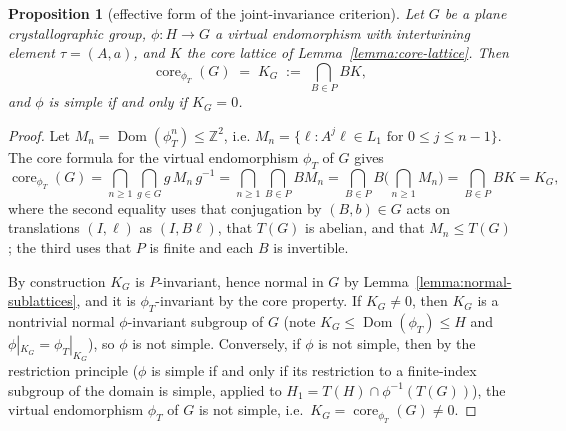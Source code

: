 \documentclass[12pt]{article}
\newtheorem{proposition}[theorem]{Proposition}
\theoremstyle{definition}
\begin{document}
\begin{proposition}[effective form of the joint-invariance
criterion]\label{prop:effective-core}
Let $G$ be a plane crystallographic group, $\phi:H\rightarrow G$ a
virtual endomorphism with intertwining element $\tau=(A,a)$, and $K$ the
core lattice of Lemma~\ref{lemma:core-lattice}. Then
\[
\operatorname{core}_{\phi_T}(G)
\;=\;
K_G \;:=\; \bigcap_{B\in P} BK,
\]
and $\phi$ is simple if and only if $K_G=0$.
\end{proposition}
\begin{proof}
Let $M_n=\operatorname{Dom}(\phi_T^n)\le\mathbb{Z}^2$, i.e.
$M_n=\{\ell : A^j\ell\in L_1 \text{ for } 0\le j\le n-1\}$. The core
formula for the virtual endomorphism $\phi_T$ of $G$ gives
\[
\operatorname{core}_{\phi_T}(G)
=\bigcap_{n\ge1}\bigcap_{g\in G} g\,M_n\,g^{-1}
=\bigcap_{n\ge1}\bigcap_{B\in P} B M_n
=\bigcap_{B\in P} B\Big(\bigcap_{n\ge1}M_n\Big)
=\bigcap_{B\in P} BK = K_G,
\]
where the second equality uses that conjugation by $(B,b)\in G$ acts on
translations $(I,\ell)$ as $(I,B\ell)$, that $T(G)$ is abelian, and that
$M_n\le T(G)$; the third uses that $P$ is finite and each $B$ is
invertible.

By construction $K_G$ is $P$-invariant, hence normal in $G$ by
Lemma~\ref{lemma:normal-sublattices}, and it is $\phi_T$-invariant by
the core property. If $K_G\ne0$, then $K_G$ is a nontrivial normal
$\phi$-invariant subgroup of $G$ (note $K_G\le
\operatorname{Dom}(\phi_T)\le H$ and $\phi|_{K_G}=\phi_T|_{K_G}$), so
$\phi$ is not simple. Conversely, if $\phi$ is not simple, then by the
restriction principle ($\phi$ is simple if and only if its restriction
to a finite-index subgroup of the domain is simple, applied to
$H_1=T(H)\cap\phi^{-1}(T(G))$), the virtual endomorphism $\phi_T$ of
$G$ is not simple, i.e.\ $K_G=\operatorname{core}_{\phi_T}(G)\ne0$.
\end{proof}
\end{document}
